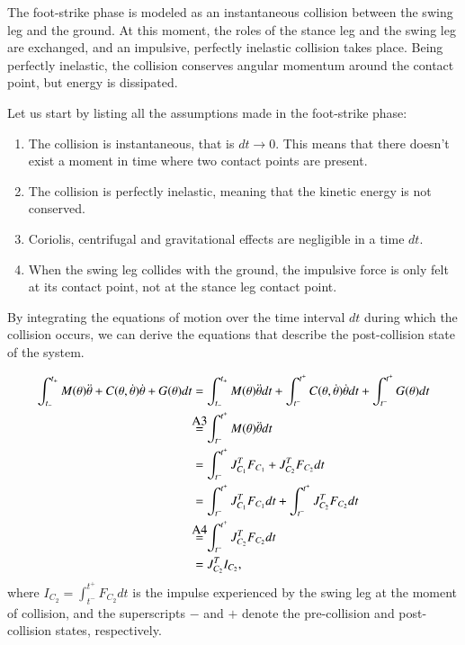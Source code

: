 The foot-strike phase is modeled as an instantaneous collision between the swing leg and the ground.
At this moment, the roles of the stance leg and the swing leg are exchanged, and an impulsive, perfectly inelastic collision takes place.
Being perfectly inelastic, the collision conserves angular momentum around the contact point, but energy is dissipated.

Let us start by listing all the assumptions made in the foot-strike phase:
\begin{enumerate}[label=A\arabic*:]
    \item The collision is instantaneous, that is $dt \longrightarrow 0$. This means that there doesn't exist a moment in time where two contact points are present.
    \item The collision is perfectly inelastic, meaning that the kinetic energy is not conserved.
    \item Coriolis, centrifugal and gravitational effects are negligible in a time $dt$.
    \item When the swing leg collides with the ground, the impulsive force is only felt at its contact point, not at the stance leg contact point.
\end{enumerate}

By integrating the equations of motion over the time interval $dt$ during which the collision occurs, we can derive the equations that describe the post-collision state of the system.

\begin{equation}\label{eq:compass_gait_poststate_derivation}
    \begin{split}
        \int_{t_-}^{t_+} M(\theta)\ddot{\theta} + C(\theta, \dot{\theta})\dot{\theta} + G(\theta) dt &= \int_{t_-}^{t_+} M(\theta)\ddot{\theta} dt + \int_{t^-}^{t^+} C(\theta, \dot{\theta})\dot{\theta} dt + \int_{t^-}^{t^+} G(\theta) dt\\
        &\myeq{A3} \int_{t^-}^{t^+} M(\theta)\ddot{\theta} dt\\
        &= \int_{t^-}^{t^+} J_{C_1}^T F_{C_1} + J_{C_2}^T F_{C_2} dt\\
        &= \int_{t^-}^{t^+} J_{C_1}^T F_{C_1} dt + \int_{t^-}^{t^+} J_{C_2}^T F_{C_2} dt\\
        &\myeq{A4} \int_{t^-}^{t^+} J_{C_2}^T F_{C_2} dt\\
        &= J_{C_2}^T I_{C_2},
    \end{split}
\end{equation}
where $I_{C_2} = \int_{t^-}^{t^+} F_{C_2} dt$ is the impulse experienced by the swing leg at the moment of collision, and the superscripts $-$ and $+$ denote the pre-collision and post-collision states, respectively.

